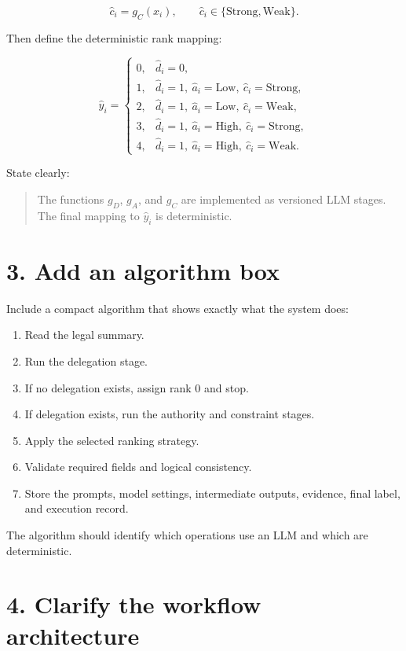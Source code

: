 \documentclass[11pt]{article}
\begin{document}
\[
\hat c_i = g_C(x_i),
\qquad
\hat c_i \in \{\text{Strong},\text{Weak}\}.
\]

Then define the deterministic rank mapping:

\[
\hat y_i =
\begin{cases}
0, & \hat d_i=0,\\
1, & \hat d_i=1,\ \hat a_i=\text{Low},\ \hat c_i=\text{Strong},\\
2, & \hat d_i=1,\ \hat a_i=\text{Low},\ \hat c_i=\text{Weak},\\
3, & \hat d_i=1,\ \hat a_i=\text{High},\ \hat c_i=\text{Strong},\\
4, & \hat d_i=1,\ \hat a_i=\text{High},\ \hat c_i=\text{Weak}.
\end{cases}
\]

State clearly:

\begin{quote}
The functions \(g_D\), \(g_A\), and \(g_C\) are implemented as versioned LLM stages. The final mapping to \(\hat y_i\) is deterministic.
\end{quote}

\section*{3. Add an algorithm box}

Include a compact algorithm that shows exactly what the system does:

\begin{enumerate}
    \item Read the legal summary.
    \item Run the delegation stage.
    \item If no delegation exists, assign rank 0 and stop.
    \item If delegation exists, run the authority and constraint stages.
    \item Apply the selected ranking strategy.
    \item Validate required fields and logical consistency.
    \item Store the prompts, model settings, intermediate outputs, evidence, final label, and execution record.
\end{enumerate}

The algorithm should identify which operations use an LLM and which are deterministic.

\section*{4. Clarify the workflow architecture}
\end{document}
